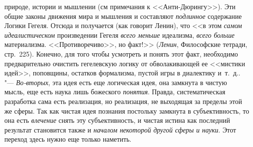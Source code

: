 {{{природе, истории и мышлении (см примечания к <<Анти-Дюрингу>>). Эти общие
законы движения мира и мышления и составляют {\em подлинное}
содержание Логики Гегеля. Отсюда и получается (как говорит
Ленин), что <<в этом {\em самом идеалистическом} произведении Гегеля
{\em всего меньше} идеализма, {\em всего больше} материализма.
<<Противоречиво>>, но факт!>> ({\em Ленин},
Философские тетради, стр.~225). Конечно, для того чтобы
усмотреть и понять этот факт, необходимо предварительно очистить
гегелевскую логику от обволакивающей ее <<мистики идей>>, поповщины, остатков
формализма, пустой игры в диалектику и~т.~д.\label{bkm:bm131}}.
"--- {\em Во-вторых},
эта идея есть еще логическая идея, она замкнута в чистую
мысль, еще есть наука лишь божеского {\em понятия}. Правда,
систематическая разработка сама есть реализация, но реализация, не
выходящая за пределы этой же сферы. Так как чистая идея познания постольку
замкнута в субъективность, то она есть {\em влечение} снять эту
субъективность, и чистая истина как последний результат становится также и
{\em началом некоторой другой сферы и
науки}. Этот переход здесь нужно еще только наметить.

}}

